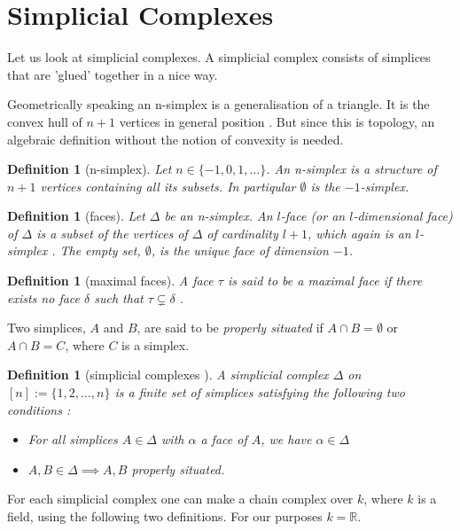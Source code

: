 \documentclass[11pt,a4paper,twoside]{report}
\newtheorem{mydef}[mythm]{Definition}
\begin{document}
\section{Simplicial Complexes}
Let us look at simplicial complexes. A simplicial complex consists of simplices that are 'glued' together in a nice way.

Geometrically speaking an n-simplex is a generalisation of a triangle. It is the convex hull of $n+1$ vertices in general position \cite{Nadathur}. But since this is topology, an algebraic definition without the notion of convexity is needed.

\begin{mydef}[n-simplex]
Let $n\in\{-1,0,1,\dots\}$. An n-simplex is a structure of $n+1$ vertices containing all its subsets. In partiqular $\emptyset$ is the $-1$-simplex.
\end{mydef}

\begin{mydef}[faces]
Let $\Delta$ be an n-simplex. An $l$-face (or an $l$-dimensional face) of $\Delta$ is a subset of the vertices of $\Delta$ of cardinality $l+1$, which again is an $l$-simplex \cite{Nadathur}. The empty set, $\emptyset$, is the unique face of dimension $-1$\cite{Allgaier}.
\end{mydef}

\begin{mydef}[maximal faces]
A face $\tau$ is said to be a maximal face if there exists no face $\delta$ such that $\tau \subsetneq \delta$ \cite[p.15]{Jonsson}.
\end{mydef}

Two simplices, $A$ and $B$, are said to be \textit{properly situated} if $A\cap B=\emptyset$ or $A\cap B = C$, where $C$ is a simplex.\cite{Nadathur}

\begin{mydef}[simplicial complexes \cite{Nadathur}]\label{def:simplicial_complexes}
A simplicial complex $\Delta$ on $[n] := \{1,2,\dots ,n\}$ is a finite set of simplices satisfying the following two conditions :
\begin{itemize}
\item For all simplices $A\in\Delta$ with $\alpha$ a face of $A$, we have $\alpha\in\Delta$
\item $A,B\in\Delta\implies A, B $ properly situated.
\end{itemize}
\end{mydef}

For each simplicial complex one can make a chain complex over $k$, where $k$ is a field, using the following two definitions. For our purposes $k=\mathbb{R}$.
\end{document}
